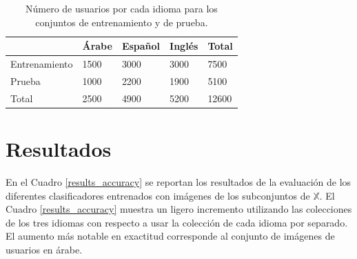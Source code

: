 \documentclass[runningheads]{llncs}
\begin{document}
\begin{table}[]
\caption{Número de usuarios por cada idioma para los conjuntos de entrenamiento y de prueba.}\label{table-datasets}
\centering
\begin{tabular}{|l|l|l|l|l|}
\hline
              & Árabe & Español & Inglés & Total \\ \hline
Entrenamiento & 1500  & 3000    & 3000   & 7500  \\ \hline
Prueba        & 1000  & 2200    & 1900   & 5100  \\ \hline
Total         & 2500  & 4900    & 5200   & 12600 \\ \hline
\end{tabular}
\end{table}

\section{Resultados}

En el Cuadro \ref{results_accuracy} se reportan los 
resultados de la evaluación de los diferentes clasificadores
entrenados con imágenes de los subconjuntos de $\mathbb{X}$.
El Cuadro \ref{results_accuracy} muestra un ligero
incremento utilizando las colecciones de los tres idiomas
con respecto a usar la colección de
cada idioma por separado.
El aumento más notable en exactitud corresponde al
conjunto de imágenes de usuarios en árabe. 
\end{document}
